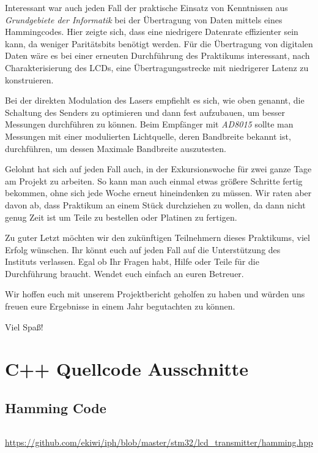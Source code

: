 \documentclass[12pt,a4paper]{article}
\newcommand{\rom}[1]{\uppercase\expandafter{\romannumeral #1\relax}}
\begin{document}
Interessant war auch jeden Fall der praktische Einsatz von Kenntnissen aus \textit{Grundgebiete der Informatik \rom{2}} bei der Übertragung von Daten mittels eines Hammingcodes. Hier zeigte sich, dass eine niedrigere Datenrate effizienter sein kann, da weniger Paritätsbits benötigt werden. Für die Übertragung von digitalen Daten wäre es bei einer erneuten Durchführung des Praktikums interessant, nach Charakterisierung des LCDs, eine Übertragungsstrecke mit niedrigerer Latenz zu konstruieren.

Bei der direkten Modulation des Lasers empfiehlt es sich, wie oben genannt, die Schaltung des Senders zu optimieren und dann fest aufzubauen, um besser Messungen durchführen zu können. Beim Empfänger mit \textit{AD8015} sollte man Messungen mit einer modulierten Lichtquelle, deren Bandbreite bekannt ist, durchführen, um dessen Maximale Bandbreite auszutesten.

Gelohnt hat sich auf jeden Fall auch, in der Exkursionswoche für zwei ganze Tage am Projekt zu arbeiten. So kann man auch einmal etwas größere Schritte fertig bekommen, ohne sich jede Woche erneut hineindenken zu müssen. Wir raten aber davon ab, dass Praktikum an einem Stück durchziehen zu wollen, da dann nicht genug Zeit ist um Teile zu bestellen oder Platinen zu fertigen.

Zu guter Letzt möchten wir den zukünftigen Teilnehmern dieses Praktikums, viel Erfolg wünschen. Ihr könnt euch auf jeden Fall auf die Unterstützung des Instituts verlassen. Egal ob Ihr Fragen habt, Hilfe oder Teile für die Durchführung braucht. Wendet euch einfach an euren Betreuer.

Wir hoffen euch mit unserem Projektbericht geholfen zu haben und würden uns freuen eure Ergebnisse in einem Jahr begutachten zu können.

Viel Spaß!

\appendix
\section{C++ Quellcode Ausschnitte}
\label{app:code}

\subsection{Hamming Code}
\label{app:code_hamming}
\inputminted[label=hamming.hpp,linenos,tabsize=4,fontsize=\normalsize,frame=lines,rulecolor=\color{gray!70},framerule=1pt]{c++}{../stm32/lcd_transmitter/hamming.hpp}
\url{https://github.com/ekiwi/iph/blob/master/stm32/lcd\_transmitter/hamming.hpp}
\end{document}
